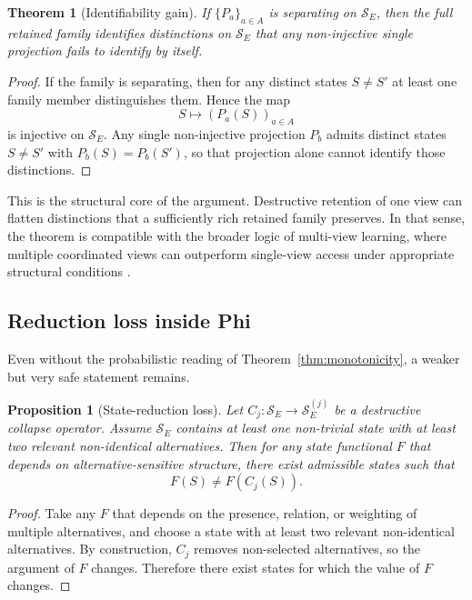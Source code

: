 \documentclass[11pt,a4paper]{article}
\newtheorem{theorem}{Theorem}
\newtheorem{proposition}{Proposition}
\begin{document}
\begin{theorem}[Identifiability gain]
\label{thm:ident}
If $\{P_a\}_{a \in A}$ is separating on $\mathcal{S}_E$, then the full retained family identifies distinctions on $\mathcal{S}_E$ that any non-injective single projection fails to identify by itself.
\end{theorem}

\begin{proof}
If the family is separating, then for any distinct states $S \neq S'$ at least one family member distinguishes them. Hence the map
\begin{equation}
S \mapsto (P_a(S))_{a \in A}
\end{equation}
is injective on $\mathcal{S}_E$. Any single non-injective projection $P_b$ admits distinct states $S \neq S'$ with $P_b(S)=P_b(S')$, so that projection alone cannot identify those distinctions.
\end{proof}

This is the structural core of the argument. Destructive retention of one view can flatten distinctions that a sufficiently rich retained family preserves. In that sense, the theorem is compatible with the broader logic of multi-view learning, where multiple coordinated views can outperform single-view access under appropriate structural conditions \cite{balcan2005pac}.

\subsection{Reduction loss inside Phi}

Even without the probabilistic reading of Theorem~\ref{thm:monotonicity}, a weaker but very safe statement remains.

\begin{proposition}[State-reduction loss]
\label{prop:reduction}
Let $C_j : \mathcal{S}_E \to \mathcal{S}_E^{(j)}$ be a destructive collapse operator. Assume $\mathcal{S}_E$ contains at least one non-trivial state with at least two relevant non-identical alternatives. Then for any state functional $F$ that depends on alternative-sensitive structure, there exist admissible states such that
\begin{equation}
F(S) \neq F(C_j(S)).
\end{equation}
\end{proposition}

\begin{proof}
Take any $F$ that depends on the presence, relation, or weighting of multiple alternatives, and choose a state with at least two relevant non-identical alternatives. By construction, $C_j$ removes non-selected alternatives, so the argument of $F$ changes. Therefore there exist states for which the value of $F$ changes.
\end{proof}
\end{document}

